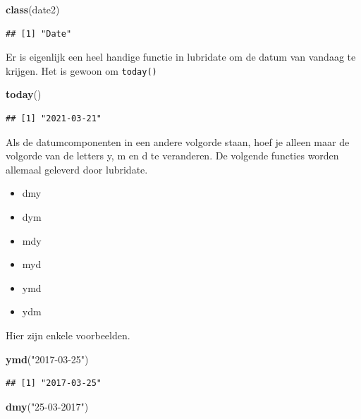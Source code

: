 \documentclass[]{tufte-book}
\newenvironment{Shaded}{}{}
\newcommand{\KeywordTok}[1]{\textcolor[rgb]{0.00,0.44,0.13}{\textbf{#1}}}
\newcommand{\NormalTok}[1]{#1}
\newcommand{\StringTok}[1]{\textcolor[rgb]{0.25,0.44,0.63}{#1}}
\providecommand{\tightlist}{%
  \setlength{\itemsep}{0pt}\setlength{\parskip}{0pt}}
\begin{document}
\begin{Shaded}
\begin{Highlighting}[]
\KeywordTok{class}\NormalTok{(date2)}
\end{Highlighting}
\end{Shaded}

\begin{verbatim}
## [1] "Date"
\end{verbatim}

Er is eigenlijk een heel handige functie in lubridate om de datum van vandaag te krijgen. Het is gewoon om \texttt{today()}

\begin{Shaded}
\begin{Highlighting}[]
\KeywordTok{today}\NormalTok{()}
\end{Highlighting}
\end{Shaded}

\begin{verbatim}
## [1] "2021-03-21"
\end{verbatim}

Als de datumcomponenten in een andere volgorde staan, hoef je alleen maar de volgorde van de letters y, m en d te veranderen. De volgende functies worden allemaal geleverd door lubridate.

\begin{itemize}
\tightlist
\item
  dmy
\item
  dym
\item
  mdy
\item
  myd
\item
  ymd
\item
  ydm
\end{itemize}

Hier zijn enkele voorbeelden.

\begin{Shaded}
\begin{Highlighting}[]
\KeywordTok{ymd}\NormalTok{(}\StringTok{"2017-03-25"}\NormalTok{)}
\end{Highlighting}
\end{Shaded}

\begin{verbatim}
## [1] "2017-03-25"
\end{verbatim}

\begin{Shaded}
\begin{Highlighting}[]
\KeywordTok{dmy}\NormalTok{(}\StringTok{"25-03-2017"}\NormalTok{)}
\end{Highlighting}
\end{Shaded}
\end{document}
